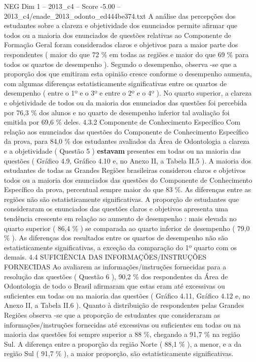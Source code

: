 \begin{textsample}{NEG Dim 1 – 2013\_c4 – Score -5.00 – 2013\_c4/enade\_2013\_odonto\_ed444be374.txt}
A análise das percepções dos estudantes sobre a clareza e objetividade dos enunciados permite afirmar que todos ou a maioria dos enunciados de questões relativas ao Componente de Formação Geral foram considerados claros e objetivos para a maior parte dos respondentes ( maior do que 72 \% em todas as regiões e maior do que 69 \% para todos os quartos de desempenho ).
Segundo o desempenho, observa -se que a proporção dos que emitiram esta opinião cresce conforme o desempenho aumenta, com algumas diferenças estatisticamente significativas entre os quartos de desempenho ( entre o 1º e o 3º e entre o 2º e o 4º ).
No quarto superior, a clareza e objetividade de todos ou da maioria dos enunciados das questões foi percebida por 76,3 \% dos alunos e no quarto de desempenho inferior tal avaliação foi emitida por 69,6 \% deles. 4.3.2 Componente de Conhecimento Específico Com relação aos enunciados das questões do Componente de Conhecimento Específico da prova, para 84,0 \% dos estudantes avaliados da Área de Odontologia a clareza e a objetividade ( Questão 5 ) \textbf{estavam} presentes em todas ou na maioria das questões ( Gráfico 4.9, Gráfico 4.10 e, no Anexo II, a Tabela II.5 ).
A maioria dos estudantes de todas as Grandes Regiões brasileiras considerou claros e objetivos todos ou a maioria dos enunciados das questões do Componente de Conhecimento Específico da prova, percentual sempre maior do que 83 \%.
As diferenças entre as regiões não são estatisticamente significativas.
A proporção de estudantes que consideraram os enunciados das questões claros e objetivos apresenta uma tendência crescente em relação ao aumento de desempenho : mais elevada no quarto superior ( 86,4 \% ) se comparada ao quarto inferior de desempenho ( 79,0 \% ).
As diferenças dos resultados entre os quartos de desempenho não são estatisticamente significativas, a exceção da comparação do 1º quarto com os demais. 4.4 SUFICIÊNCIA DAS INFORMAÇÕES/INSTRUÇÕES FORNECIDAS Ao avaliarem as informações/instruções fornecidas para a resolução das questões ( Questão 6 ), 90,2 \% dos respondentes da Área de Odontologia de todo o Brasil afirmaram que estas eram até excessivas ou suficientes em todas ou na maioria das questões ( Gráfico 4.11, Gráfico 4.12 e, no Anexo II, a Tabela II.6 ).
Quanto à distribuição de respondentes pelas Grandes Regiões observa -se que a proporção de estudantes que consideraram as informações/instruções fornecidas até excessivas ou suficientes em todas ou na maioria das questões foi sempre superior a 88 \%, chegando a 91,7 \% na região Sul.
A diferença entre a proporção da região Norte ( 88,1 \% ), a menor, e a da região Sul ( 91,7 \% ), a maior proporção, são estatisticamente significativas.

\end{textsample}

